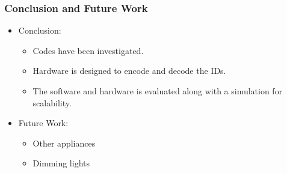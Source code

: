 \documentclass{beamer}
\begin{document}


	\begin{frame}\frametitle{Conclusion and Future Work}

		\begin{itemize}
			\item Conclusion:
				\begin{itemize}

					\item Codes have been investigated.

					\item Hardware is designed to encode and decode the IDs.

					\item The software and hardware is evaluated along with a simulation for scalability.

				\end{itemize}

			\item Future Work:
				\begin{itemize}

					\item Other appliances

					\item Dimming lights

				\end{itemize}
		\end{itemize}

		
		
		

	\end{frame}
\end{document}
